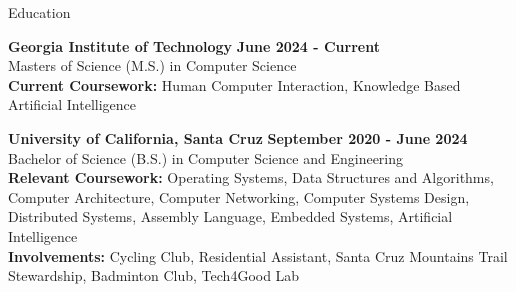 \documentclass{resume}
\begin{document}
\begin{rSection}{\large Education}

{\bf Georgia Institute of Technology} \hfill {\bf{June 2024 - Current}}
\\ Masters of Science (M.S.) in Computer Science\hfill %
\\ \textbf{Current Coursework:} Human Computer Interaction, Knowledge Based Artificial Intelligence


{\bf University of California, Santa Cruz} \hfill {\bf{September 2020 - June 2024}}
\\ Bachelor of Science (B.S.) in Computer Science and Engineering\hfill %
\\ \textbf{Relevant Coursework:} Operating Systems, Data Structures and Algorithms, Computer Architecture, Computer Networking, Computer Systems Design, Distributed Systems, Assembly Language, Embedded Systems, Artificial Intelligence
\\ \textbf{Involvements:} Cycling Club, Residential Assistant, Santa Cruz Mountains Trail Stewardship, Badminton Club, Tech4Good Lab

\end{rSection}
\end{document}
